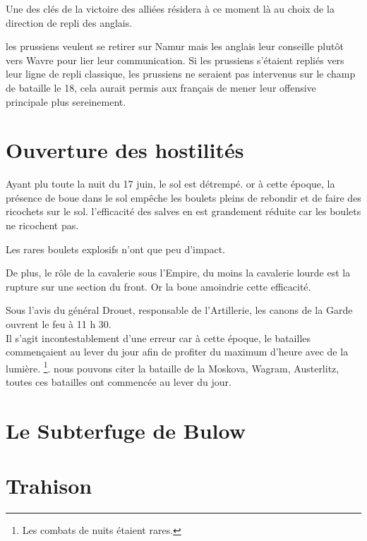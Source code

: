Une des clés de la victoire des alliées résidera à ce moment là au choix de la direction de repli des anglais.

les prussiens veulent se retirer sur Namur mais les anglais leur conseille plutôt vers Wavre pour lier leur communication. Si les prussiens s'étaient repliés vers leur ligne de repli classique, les prussiens ne seraient pas intervenus sur le champ de bataille le 18, cela aurait permis aux français de mener leur offensive principale plus sereinement.













\section{Ouverture des hostilités}

Ayant plu toute la nuit du 17 juin, le sol est détrempé. or à cette époque, la présence de boue dans le sol empêche les boulets pleins de rebondir et de faire des ricochets sur le sol. l'efficacité des salves en est grandement réduite car les boulets ne ricochent pas.

Les rares boulets explosifs n'ont que peu d'impact.

De plus, le rôle de la cavalerie sous l'Empire, du moins la cavalerie lourde est la rupture sur une section du front. Or la boue amoindrie cette efficacité.


Sous l'avis du général Drouet, responsable de l'Artillerie, les canons de la Garde ouvrent le feu à 11 h 30. \\

Il s'agit incontestablement d'une erreur car à cette époque, le batailles commençaient au lever du jour afin de profiter du maximum d'heure avec de la lumière. \footnote{Les combats de nuits étaient rares.}. nous pouvons citer la bataille de la Moskova, Wagram, Austerlitz, toutes ces batailles ont commencée au lever du jour.






\section{Le Subterfuge de Bulow}
\section{Trahison}

